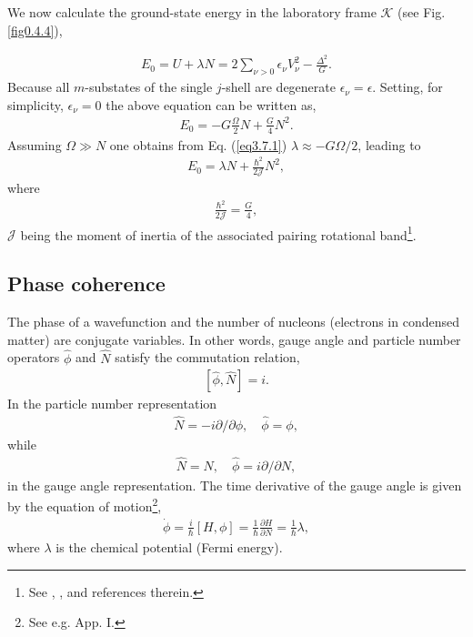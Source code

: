   
  We now calculate the ground-state energy in the laboratory frame $\mathcal K$ (see Fig. \ref{fig0.4.4}), 
 
   \begin{align}\label{eq4.7.4x}
E_0=U+\lambda N=2\sum_{\nu>0}\epsilon_\nu V^2_\nu-\frac{\Delta^2}{G}.
 \end{align} 
 Because all $m$-substates of the single $j$-shell are degenerate $\epsilon_\nu=\epsilon$. Setting, for simplicity, $\epsilon_\nu=0$ the above equation can be written as,
    \begin{align}\label{eq4.7.5x}
 E_0=-G\frac{\Omega}{2}N+\frac{G}{4}N^2. 
 \end{align}
 Assuming $\Omega\gg N$ one obtains from Eq. (\ref{eq3.7.1}) $\lambda\approx-G\Omega/2$, leading to 
     \begin{align}\label{eq4.7.6x}
 E_0=\lambda N+\frac{\hbar^2}{2\mathcal J}N^2,
 \end{align}
 where 
 \begin{align}\label{eq4.7.7x}
 \frac{\hbar^2}{2\mathcal J}=\frac{G}{4},
 \end{align}
$\mathcal J$ being the moment of inertia of the associated pairing rotational band\footnote{See \cite{Bes:66}, \cite{Broglia:00}, and references therein.}.  




\subsection{Phase coherence}\label{C3AppD}
The phase of a wavefunction and the number of nucleons (electrons in condensed matter) are conjugate variables. In other words,  gauge angle and  particle number operators $\hat{\phi}$ and $\hat N$ satisfy the commutation relation,
  \begin{align}\label{eq3.7.8}
\left[\hat{\phi},\hat{N}\right]=i.
    \end{align}
In the particle number representation
  \begin{align}\label{eq3.7.9}
\hat N=-i\partial/\partial \phi,\quad \hat \phi=\phi,
    \end{align}
while
  \begin{align}\label{eq3.7.10}
\hat N=N,\quad \hat\phi=i\partial/\partial N,
    \end{align}
in the gauge angle representation. The time derivative of the gauge angle is given by the equation of motion\footnote{See e.g. \cite{Brink:05} App. I.},
  \begin{align}\label{eq3.7.11}
  \dot{\phi}=\frac{i}{\hbar}\left[H,\phi \right]=\frac{1}{\hbar}\frac{\partial H}{\partial N}=\frac{1}{\hbar}\lambda,
    \end{align}
where $\lambda$ is the chemical potential (Fermi energy).







